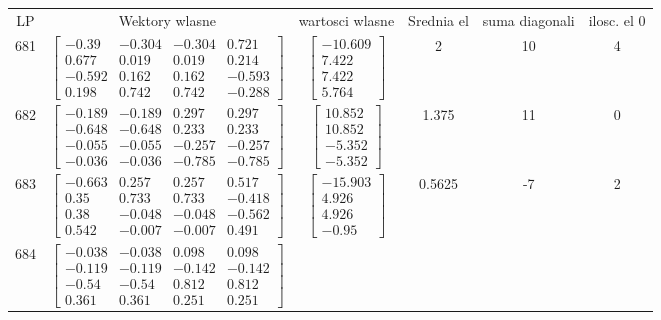 \documentclass[a4paper,12pt]{article}
\begin{document}
\bgroup {} \vspace{0.2in} \begin{tabular}{c c c c c c}
LP &Wektory wlasne & wartosci wlasne & Srednia el & suma diagonali & ilosc. el 0\\
681
&
$\begin{bmatrix} -0.39 & -0.304 & -0.304 & 0.721 \\ 0.677 & 0.019 & 0.019 & 0.214 \\ -0.592 & 0.162 & 0.162 & -0.593 \\ 0.198 & 0.742 & 0.742 & -0.288 \end{bmatrix}$
&
$\begin{bmatrix} -10.609 \\ 7.422 \\ 7.422 \\ 5.764 \end{bmatrix}$
&
2
&
10
&
4
\\
682
&
$\begin{bmatrix} -0.189 & -0.189 & 0.297 & 0.297 \\ -0.648 & -0.648 & 0.233 & 0.233 \\ -0.055 & -0.055 & -0.257 & -0.257 \\ -0.036 & -0.036 & -0.785 & -0.785 \end{bmatrix}$
&
$\begin{bmatrix} 10.852 \\ 10.852 \\ -5.352 \\ -5.352 \end{bmatrix}$
&
1.375
&
11
&
0
\\
683
&
$\begin{bmatrix} -0.663 & 0.257 & 0.257 & 0.517 \\ 0.35 & 0.733 & 0.733 & -0.418 \\ 0.38 & -0.048 & -0.048 & -0.562 \\ 0.542 & -0.007 & -0.007 & 0.491 \end{bmatrix}$
&
$\begin{bmatrix} -15.903 \\ 4.926 \\ 4.926 \\ -0.95 \end{bmatrix}$
&
0.5625
&
-7
&
2
\\
684
&
$\begin{bmatrix} -0.038 & -0.038 & 0.098 & 0.098 \\ -0.119 & -0.119 & -0.142 & -0.142 \\ -0.54 & -0.54 & 0.812 & 0.812 \\ 0.361 & 0.361 & 0.251 & 0.251 \end{bmatrix}$

\end{tabular}
\end{document}
